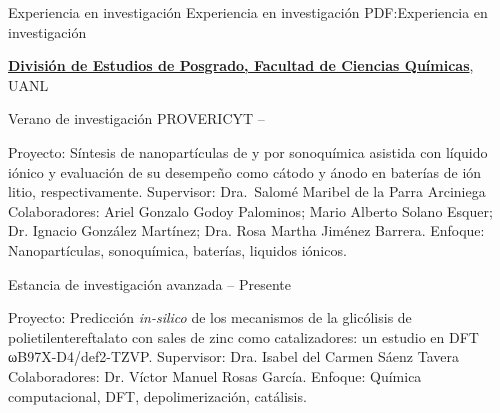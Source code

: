 \Section
{Experiencia en investigación}
{Experiencia en investigación}
{PDF:Experiencia en investigación}

\Entry
\href{http://www.fcq.uanl.mx/oferta-educativa/posgrado/}
{\textbf{División de Estudios de Posgrado, Facultad de Ciencias Químicas}},
UANL

\Gap
\BulletItem
Verano de investigación PROVERICYT
\hfill
{} --
\begin{Detail}
	\SubBulletItem
	Proyecto:
	Síntesis de nanopartículas de  y  por sonoquímica asistida con líquido iónico y evaluación de su desempeño como cátodo y ánodo en baterías de ión litio, respectivamente.
	\SubBulletItem
	Supervisor:
	Dra.~Salomé Maribel de la Parra Arciniega\\
	Colaboradores: Ariel Gonzalo Godoy Palominos; Mario Alberto Solano Esquer; Dr. Ignacio González Martínez; Dra. Rosa Martha Jiménez Barrera.
	\SubBulletItem
	Enfoque:
	Nanopartículas, sonoquímica, baterías, liquidos iónicos.
\end{Detail}

\Gap
\BulletItem
Estancia de investigación avanzada
\hfill
{} -- Presente
\begin{Detail}
	\SubBulletItem
	Proyecto:
	Predicción \textit{in-silico} de los mecanismos de la glicólisis de polietilentereftalato con sales de zinc como catalizadores: un estudio en DFT ωB97X-D4/def2-TZVP.
	\SubBulletItem
	Supervisor:
	Dra. Isabel del Carmen Sáenz Tavera\\
	Colaboradores: Dr. Víctor Manuel Rosas García.
	\SubBulletItem
	Enfoque:
	Química computacional, DFT, depolimerización, catálisis.
\end{Detail}
